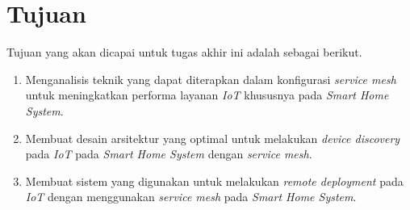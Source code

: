 \section{Tujuan}

Tujuan yang akan dicapai untuk tugas akhir ini adalah sebagai berikut.

\begin{enumerate}
  \item Menganalisis teknik yang dapat diterapkan dalam konfigurasi \textit{service mesh} untuk meningkatkan performa layanan \textit{IoT} khususnya pada \textit{Smart Home System}.
  \item Membuat desain arsitektur yang optimal untuk melakukan \textit{device discovery} pada \textit{IoT} pada \textit{Smart Home System} dengan \textit{service mesh}.
  \item Membuat sistem yang digunakan untuk melakukan \textit{remote deployment} pada \textit{IoT} dengan menggunakan \textit{service mesh} pada \textit{Smart Home System}.
\end{enumerate}
